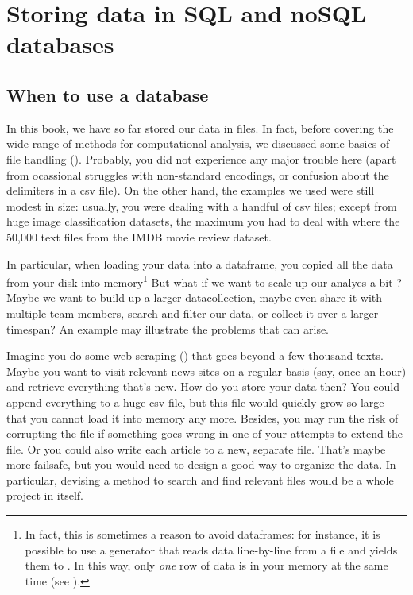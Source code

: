 \section{Storing data in SQL and noSQL databases}
\label{sec:databases}

\subsection{When to use a database}
In this book, we have so far stored our data in files. In fact, before
covering the wide range of methods for computational analysis, we
discussed some basics of file handling
(). Probably, you did not experience any major
trouble here (apart from ocassional struggles with non-standard
encodings, or confusion about the delimiters in a csv file). On the
other hand, the examples we used were still modest in size: usually,
you were dealing with a handful of csv files; except from huge image classification datasets, the maximum you had to
deal with where the 50,000 text files from the IMDB movie review
dataset.

In particular, when loading your data into a dataframe, you copied all
the data from your disk into memory\footnote{In fact, this is
  sometimes a reason to avoid dataframes: for instance, it is possible
  to use a generator that reads data line-by-line from a file and
  yields them to . In this way, only \emph{one} row
  of data is in your memory at the same time (see ).}
But what if we want to scale up our analyes a bit
\cite[see][]{Trilling2018b}? Maybe we want to build up a larger
datacollection, maybe even share it with multiple team members, search
and filter our data, or collect it over a larger timespan? An
example may illustrate the problems that can arise.

Imagine you do some web scraping () that goes beyond
a few thousand texts. Maybe you want to visit relevant news sites on a
regular basis (say, once an hour) and retrieve everything that's
new. How do you store your data then? You could append everything to a
huge csv file, but this file would quickly grow so large that you
cannot load it into memory any more. Besides, you may run the risk of
corrupting the file if something goes wrong in one of your attempts to
extend the file. Or you could also write each article to a new, separate file.
That's maybe more failsafe, but you would need to design a good way
to organize the data. In particular, devising a method to search
and find relevant files would be a whole project in itself.

